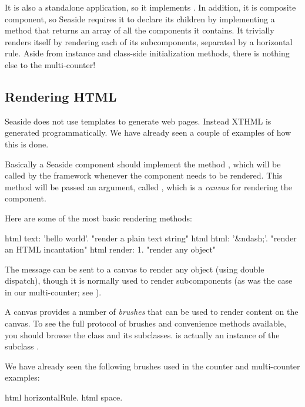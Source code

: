\documentclass[a4paper,10pt,twoside]{book}
\begin{document}
It is also a standalone application, so it implements .
In addition, it is composite component, so Seaside requires it to declare its children by implementing a method  that returns an array of all the components it contains.
It trivially renders itself by rendering each of its subcomponents, separated by a horizontal rule.
Aside from instance and class-side initialization methods, there is nothing else to the multi-counter!

\subsection{Rendering HTML}

Seaside does not use templates to generate web pages.
Instead XTHML is generated programmatically.
We have already seen a couple of examples of how this is done.

Basically a Seaside component should implement the method , which will be called by the framework whenever the component needs to be rendered.
This method will be passed an argument, called , which is a \emph{canvas} for rendering the component.

Here are some of the most basic rendering methods:
\begin{code}{}
html text: 'hello world'.  "render a plain text string"
html html: '&ndash;'.     "render an HTML incantation"
html render: 1.              "render any object"
\end{code}

The message  can be sent to a canvas to render any object (using double dispatch), though it is normally used to render subcomponents (as was the case in our multi-counter; see ).

A canvas provides a number of \emph{brushes} that can be used to render content on the canvas.
To see the full protocol of brushes and convenience methods available, you should browse the class  and its subclasses.
 is actually an instance of the subclass .

We have already seen the following brushes used in the counter and multi-counter examples:
\begin{code}{}
html horizontalRule.
html space.
\end{code}
\end{document}

